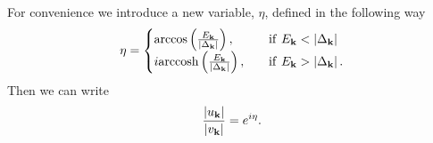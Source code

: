 \\
\\
For convenience we introduce a new variable, $\eta$, defined in the following way
\begin{equation}
    \eta = 
    \begin{cases}
    \arccos \left(\frac{E_{\mathbf{k}}}{\left|\Delta_{\mathbf{k}}\right|}\right), \quad &\mathrm{if} \ E_{\mathbf{k}}<\left|\Delta_{\mathbf{k}}\right| \\
    i\mathrm{arccosh}\left( \frac{E_{\mathbf{k}}}{\left|\Delta_{\mathbf{k}}\right|}\right), \quad &\mathrm{if} \ E_{\mathbf{k}}>\left|\Delta_{\mathbf{k}}\right|.
    \end{cases}
\label{eta}
\end{equation}
Then we can write 
\begin{equation}
    \frac{\left|u_{\mathbf{k}}\right|}{\left|v_{\mathbf{k}}\right|}= e^{i\eta}.
\end{equation}

